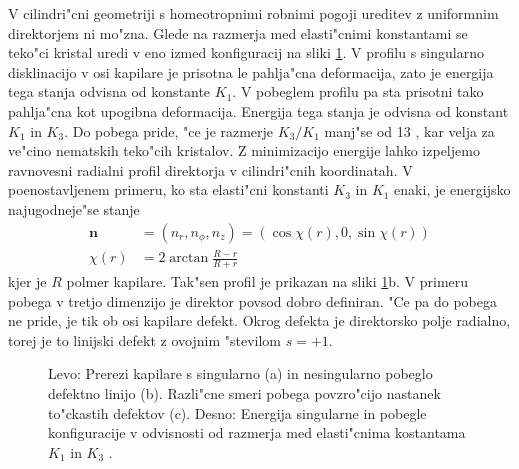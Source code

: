 \documentclass[12pt,twoside,openright,final,a4paper]{report}
\renewcommand{\vec}{\mathbf}
\begin{document}
V cilindri"cni geometriji s homeotropnimi robnimi pogoji ureditev z uniformnim direktorjem ni mo"zna. 
Glede na razmerja med elasti"cnimi konstantami se teko"ci kristal uredi v eno izmed konfiguracij na sliki \ref{fig:director-profiles}. 
V profilu s singularno disklinacijo v osi kapilare je prisotna le pahlja"cna deformacija, zato je energija tega stanja odvisna od konstante $K_1$. 
V pobeglem profilu pa sta prisotni tako pahlja"cna kot upogibna deformacija.
Energija tega stanja je odvisna od konstant $K_1$ in $K_3$. 
Do pobega pride, "ce je razmerje $K_3/K_1$ manj"se od 13 \cite{kleman}, kar velja za ve"cino nematskih teko"cih kristalov. 
Z minimizacijo energije lahko izpeljemo ravnovesni radialni profil direktorja v cilindri"cnih koordinatah. 
V poenostavljenem primeru, ko sta elasti"cni konstanti $K_3$ in $K_1$ enaki, je energijsko najugodneje"se stanje 
\begin{align}
 \vec n &= (n_r, n_\phi, n_z) = (\cos \chi(r), 0, \sin \chi(r)) \\
 \chi(r) &= 2 \arctan \frac{R-r}{R+r}
\end{align}
kjer je $R$ polmer kapilare. 
Tak"sen profil je prikazan na sliki \ref{fig:director-profiles}b. 
V primeru pobega v tretjo dimenzijo je direktor povsod dobro definiran. 
"Ce pa do pobega ne pride, je tik ob osi kapilare defekt. Okrog defekta je direktorsko polje radialno, torej je to linijski defekt z ovojnim "stevilom $s=+1$. 

\begin{figure}[!htbp]
\centering
{}
\caption{Levo: Prerezi kapilare s singularno (a) in nesingularno pobeglo defektno linijo (b). 
Razli"cne smeri pobega povzro"cijo nastanek to"ckastih defektov (c). Desno: Energija singularne in pobegle konfiguracije v odvisnosti od razmerja med elasti"cnima kostantama $K_1$ in $K_3$ \cite{kleman}. }
 \label{fig:director-profiles}
\end{figure}
\end{document}
